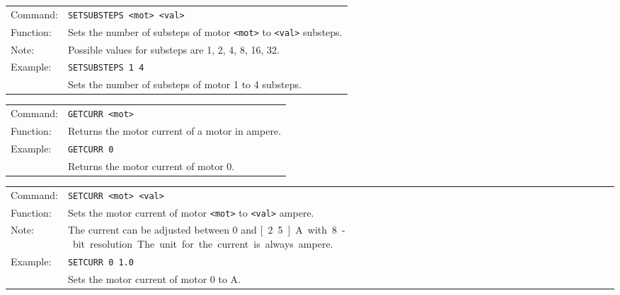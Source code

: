 \vspace{\vdistace}

\begin{table}[h]
  \begin{tabularx}{\textwidth}{lX}
    Command:  & \texttt{SETSUBSTEPS <mot> <val>}\\
    Function: & Sets the number of substeps of motor \texttt{<mot>} to \texttt{<val>} substeps.\\
    Note:     & Possible values for substeps are 1, 2, 4, 8, 16, 32.\\
    Example:  & \texttt{SETSUBSTEPS 1 4}\\
              & Sets the number of substeps of motor 1 to 4 substeps.
  \end{tabularx}
\end{table}

\vspace{\vdistace}

\begin{table}[h]
  \begin{tabularx}{\textwidth}{lX}
    Command:  & \texttt{GETCURR <mot>}\\
    Function: & Returns the motor current of a motor in ampere.\\
    Example:  & \texttt{GETCURR 0}\\
              & Returns the motor current of motor 0.
  \end{tabularx}
\end{table}

\vspace{\vdistace}

\begin{table}[h]
  \begin{tabularx}{\textwidth}{lX}
    Command:  & \texttt{SETCURR <mot> <val>}\\
    Function: & Sets the motor current of motor \texttt{<mot>} to \texttt{<val>} ampere.\\
    Note:     & The current can be adjusted between 0 and \unit[2.5]{A} with 8-bit resolution. The unit for the current is always ampere.\\
    Example:  & \texttt{SETCURR 0 1.0}\\
              & Sets the motor current of motor 0 to \unit[1]{A}.
  \end{tabularx}
\end{table}

\vspace{\vdistace}

